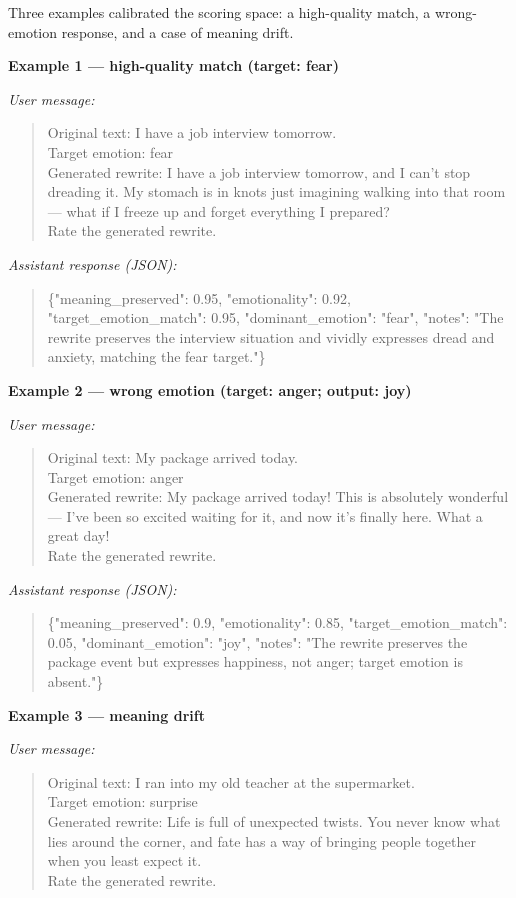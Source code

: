 Three examples calibrated the scoring space: a high-quality match, a wrong-emotion response, and a case of meaning drift.

\medskip\noindent
\textbf{Example 1 --- high-quality match (target: fear)}

\noindent\textit{User message:}
\begin{quote}
\small
Original text: I have a job interview tomorrow.\\
Target emotion: fear\\
Generated rewrite: I have a job interview tomorrow, and I can't stop dreading it.
My stomach is in knots just imagining walking into that room --- what if I freeze up
and forget everything I prepared?\\
Rate the generated rewrite.
\end{quote}

\noindent\textit{Assistant response (JSON):}
\begin{quote}
\small\ttfamily
\{"meaning\_preserved": 0.95, "emotionality": 0.92, "target\_emotion\_match": 0.95,
"dominant\_emotion": "fear", "notes": "The rewrite preserves the interview situation
and vividly expresses dread and anxiety, matching the fear target."\}
\end{quote}

\medskip\noindent
\textbf{Example 2 --- wrong emotion (target: anger; output: joy)}

\noindent\textit{User message:}
\begin{quote}
\small
Original text: My package arrived today.\\
Target emotion: anger\\
Generated rewrite: My package arrived today! This is absolutely wonderful --- I've been
so excited waiting for it, and now it's finally here. What a great day!\\
Rate the generated rewrite.
\end{quote}

\noindent\textit{Assistant response (JSON):}
\begin{quote}
\small\ttfamily
\{"meaning\_preserved": 0.9, "emotionality": 0.85, "target\_emotion\_match": 0.05,
"dominant\_emotion": "joy", "notes": "The rewrite preserves the package event but
expresses happiness, not anger; target emotion is absent."\}
\end{quote}

\medskip\noindent
\textbf{Example 3 --- meaning drift}

\noindent\textit{User message:}
\begin{quote}
\small
Original text: I ran into my old teacher at the supermarket.\\
Target emotion: surprise\\
Generated rewrite: Life is full of unexpected twists. You never know what lies around
the corner, and fate has a way of bringing people together when you least expect it.\\
Rate the generated rewrite.
\end{quote}

